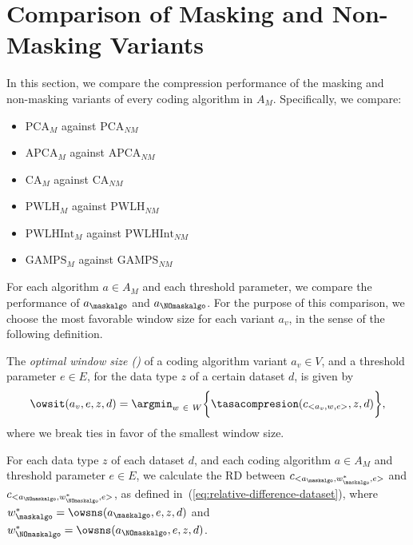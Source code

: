 
\clearpage
\section{Comparison of Masking and Non-Masking Variants}
\label{secX:rendimiento-relativo}


In this section, we compare the compression performance of the masking and non-masking variants of every coding algorithm in $A_M$. Specifically, we compare:


\vspace{-6pt}
\newcommand{\against}[1]{$\text{{#1}}_\textit{M}$ against $\text{{#1}}_\textit{NM}$}
\begin{itemize}
    \item \against{PCA}
    \item \against{APCA}
    \item \against{CA}
    \item \against{PWLH}
    \item \against{PWLHInt}
    \item \against{GAMPS}
\end{itemize}


\vspace{+3pt}
For each algorithm $a \in A_M$ and each threshold parameter, we compare the performance of $a_\maskalgo$ and $a_\NOmaskalgo$. For the purpose of this comparison, we choose the most favorable window size for each variant $a_v$, in the sense of the following definition.


\vspace{+5pt}
\begin{defcion}
\label{def:ows}
The \textit{optimal window size (\owsit)} of a coding algorithm variant $a_v \in V$, and a threshold parameter $e \in E$, for the data type $z$ of a certain dataset $d$, is given by
\begin{equation}
\label{eq:ows}
\owsit(a_v, e, z, d) = \argmin_{w\ \in \ W} \biggl\{ \tasacompresion(c_{<a_v, w, e>}, z, d) \biggr\},
\end{equation}
where we break ties in favor of the smallest window size.
\end{defcion}


For each data type $z$ of each dataset $d$, and each coding algorithm $a \in A_M$ and threshold parameter $e \in E$, we calculate the RD between $c_{<a_\maskalgo, w_\maskalgo^{*}, e>}$ and $c_{<a_\NOmaskalgo, w_\NOmaskalgo^{*}, e>}$, as defined in~(\ref{eq:relative-difference-dataset}), where $w_\maskalgo^{*}=\owsns(a_\maskalgo, e, z, d)$ and $w_\NOmaskalgo^{*}=\owsns(a_\NOmaskalgo, e, z, d)$.



